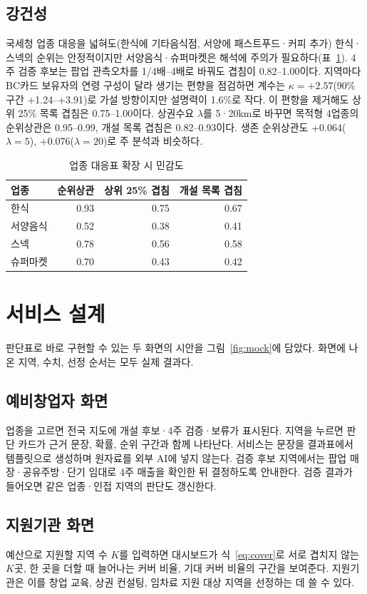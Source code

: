 \documentclass[journal,a4paper]{IEEEtran}
\begin{document}
\subsection{강건성}
국세청 업종 대응을 넓혀도(한식에 기타음식점, 서양에 패스트푸드·커피 추가) 한식·스넥의 순위는 안정적이지만 서양음식·슈퍼마켓은 해석에 주의가 필요하다(표~\ref{tab:sens}). 4주 검증 후보는 팝업 관측오차를 1/4배--4배로 바꿔도 겹침이 0.82--1.00이다. 지역마다 BC카드 보유자의 연령 구성이 달라 생기는 편향을 점검하면 계수는 $\kappa=+2.57$(90\% 구간 +1.24--+3.91)로 가설 방향이지만 설명력이 1.6\%로 작다. 이 편향을 제거해도 상위 25\% 목록 겹침은 0.75--1.00이다. 상권수요 $\lambda$를 5·20km로 바꾸면 목적형 4업종의 순위상관은 0.95--0.99, 개설 목록 겹침은 0.82--0.93이다. 생존 순위상관도 +0.064($\lambda=5$), +0.076($\lambda=20$)로 주 분석과 비슷하다.

\begin{table}[t]
\centering
\caption{업종 대응표 확장 시 민감도}
\label{tab:sens}
{\footnotesize\begin{tabular}{lrrr}\toprule
업종 & 순위상관 & 상위 25\% 겹침 & 개설 목록 겹침 \\\midrule
한식 & 0.93 & 0.75 & 0.67 \\
서양음식 & 0.52 & 0.38 & 0.41 \\
스넥 & 0.78 & 0.56 & 0.58 \\
슈퍼마켓 & 0.70 & 0.43 & 0.42 \\\bottomrule\end{tabular}}
\end{table}

\section{서비스 설계}
판단표로 바로 구현할 수 있는 두 화면의 시안을 그림~\ref{fig:mock}에 담았다. 화면에 나온 지역, 수치, 선정 순서는 모두 실제 결과다.

\subsection{예비창업자 화면}
업종을 고르면 전국 지도에 개설 후보·4주 검증·보류가 표시된다. 지역을 누르면 판단 카드가 근거 문장, 확률, 순위 구간과 함께 나타난다. 서비스는 문장을 결과표에서 템플릿으로 생성하며 원자료를 외부 AI에 넣지 않는다. 검증 후보 지역에서는 팝업 매장·공유주방·단기 임대로 4주 매출을 확인한 뒤 결정하도록 안내한다. 검증 결과가 들어오면 같은 업종·인접 지역의 판단도 갱신한다.

\subsection{지원기관 화면}
예산으로 지원할 지역 수 $K$를 입력하면 대시보드가 식~\eqref{eq:cover}로 서로 겹치지 않는 $K$곳, 한 곳을 더할 때 늘어나는 커버 비율, 기대 커버 비율의 구간을 보여준다. 지원기관은 이를 창업 교육, 상권 컨설팅, 임차료 지원 대상 지역을 선정하는 데 쓸 수 있다.
\end{document}
